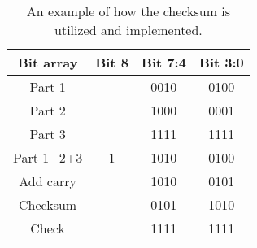 \begin{table}[H]
\centering
\begin{tabular}{|c|c|c|c|}
\hline
Bit array  & Bit 8                 & \multicolumn{1}{l|}{Bit 7:4} & Bit 3:0 \\ \hline
Part 1     &                       & 0010                         & 0100    \\ \hline
Part 2     &                       & 1000                         & 0001    \\ \hline
Part 3     &                       & 1111                         & 1111    \\ \hline
Part 1+2+3 & 1                     & 1010                         & 0100    \\ \hline
Add carry  & \multicolumn{1}{l|}{} & 1010                         & 0101    \\ \hline
Checksum   & \multicolumn{1}{l|}{} & 0101                         & 1010    \\ \hline
Check      & \multicolumn{1}{l|}{} & 1111                         & 1111    \\ \hline
\end{tabular}
\caption{An example of how the checksum is utilized and implemented.}
\label{tab:checksum}
\end{table}











